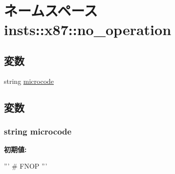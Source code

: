 \hypertarget{namespaceinsts_1_1x87_1_1no__operation}{
\section{ネームスペース insts::x87::no\_\-operation}
\label{namespaceinsts_1_1x87_1_1no__operation}
}
\subsection*{変数}
\begin{DoxyCompactItemize}
\item 
string \hyperlink{namespaceinsts_1_1x87_1_1no__operation_a770f11a173e99389a8802f0107ed8f52}{microcode}
\end{DoxyCompactItemize}


\subsection{変数}
\hypertarget{namespaceinsts_1_1x87_1_1no__operation_a770f11a173e99389a8802f0107ed8f52}{
\subsubsection[{microcode}]{\setlength{\rightskip}{0pt plus 5cm}string {\bf microcode}}}
\label{namespaceinsts_1_1x87_1_1no__operation_a770f11a173e99389a8802f0107ed8f52}
{\bfseries 初期値:}
\begin{DoxyCode}
'''
# FNOP
'''
\end{DoxyCode}
